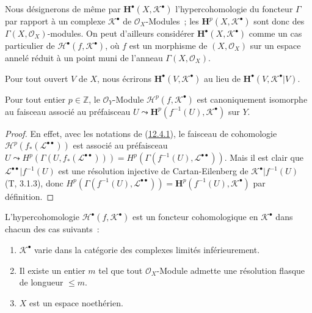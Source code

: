 \begin{env}[12.4.2]
\label{0.12.4.2-fr}
Nous désignerons de même par $\mathbf H^\bullet(X,\mathcal K^\bullet)$
l'hypercohomologie du foncteur $\Gamma$ par rapport à un complexe
$\mathcal K^\bullet$ de $\mathcal O_X$-Modules~; les
$\mathbf H^p(X,\mathcal K^\bullet)$ sont donc des
$\Gamma(X,\mathcal O_X)$-modules. On peut d'ailleurs considérer
$\mathbf H^\bullet(X,\mathcal K^\bullet)$ comme un cas particulier de
$\mathscr H^\bullet(f,\mathcal K^\bullet)$, où $f$ est un morphisme de
$(X,\mathcal O_X)$ sur un espace annelé réduit à un point muni de l'anneau
$\Gamma(X,\mathcal O_X)$.

Pour tout ouvert $V$ de $X$, nous écrirons
$\mathbf H^\bullet(V,\mathcal K^\bullet)$ au lieu de
$\mathbf H^\bullet(V,\mathcal K^\bullet|V)$.
\end{env}

\begin{proposition}[12.4.3]
\label{0.12.4.3-fr}
Pour tout entier $p\in\mathbb Z$, le $\mathcal O_Y$-Module
$\mathscr H^p(f,\mathcal K^\bullet)$ est canoniquement isomorphe au
faisceau associé au préfaisceau
$U\leadsto\mathbf H^p(f^{-1}(U),\mathcal K^\bullet)$ sur $Y$.
\end{proposition}

\begin{proof}
En effet, avec les notations de
(\hyperref[0.12.4.1-fr]{12.4.1}), le faisceau de cohomologie
$\mathcal H^p(f_*(\mathcal L^{\bullet\bullet}))$ est associé au préfaisceau
$U\leadsto H^p(\Gamma(U,f_*(\mathcal L^{\bullet\bullet})))=H^p(\Gamma(f^{-1}(U),\mathcal L^{\bullet\bullet}))$.
Mais il est clair que
$\mathcal L^{\bullet\bullet}|f^{-1}(U)$ est une résolution injective de
Cartan-Eilenberg de $\mathcal K^\bullet|f^{-1}(U)$ (T, 3.1.3), donc
$H^p(\Gamma(f^{-1}(U),\mathcal L^{\bullet\bullet}))=\mathbf H^p(f^{-1}(U),\mathcal K^\bullet)$
par définition.
\end{proof}

\begin{proposition}[12.4.4]
\label{0.12.4.4-fr}
L'hypercohomologie $\mathscr H^\bullet(f,\mathcal K^\bullet)$ est
un foncteur cohomologique en $\mathcal K^\bullet$ dans chacun des cas
suivants~:
\begin{enumerate}
\item[\emph{a)}]
$\mathcal K^\bullet$ varie dans la catégorie des complexes limités
inférieurement.
\item[\emph{b)}]
Il existe un entier $m$ tel que tout $\mathcal O_X$-Module admette
une résolution flasque de longueur $\leq m$.
\item[\emph{c)}]
$X$ est un espace noethérien.
\end{enumerate}
\end{proposition}

